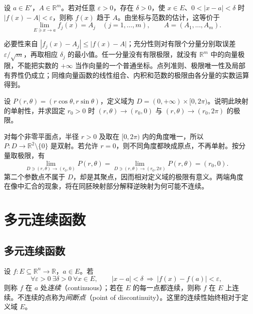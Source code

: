 \begin{definition}
\label{def:vector-valued-function-limit}
设 $a\in E'$，$A\in\mathbb R^m$。若对任意 $\varepsilon>0$，存在 $\delta>0$，使 $x\in E$、$0<|x-a|<\delta$ 时 $|f(x)-A|<\varepsilon$，则称 $f(x)$ 趋于 $A$。由坐标与范数的估计，这等价于
\[
    \lim_{E\ni x\to a}f_j(x)=A_j\quad(j=1,\ldots,m),\qquad
    A=(A_1,\ldots,A_m).
\]
\end{definition}

必要性来自 $|f_j(x)-A_j|\leq|f(x)-A|$；充分性则对有限个分量分别取误差 $\varepsilon/\sqrt m$，再取相应 $\delta_j$ 的最小值。任一分量没有有限极限，就没有 $\mathbb R^m$ 中的向量极限，不能把实数的 $+\infty$ 当作向量的一个普通坐标。点列准则、极限唯一性及局部有界性仍成立；同维向量函数的线性组合、内积和范数的极限由各分量的实数运算得到。

\begin{example}
\label{ex:polar-map-boundary-limits}
设 $P(r,\theta)=(r\cos\theta,r\sin\theta)$，定义域为 $D=(0,+\infty)\times[0,2\pi)$。说明此映射的单射性，并求固定 $r_0>0$ 时 $(r,\theta)\to(r_0,0)$ 与 $(r,\theta)\to(r_0,2\pi)$ 的极限。
\end{example}

\begin{solve}
对每个非零平面点，半径 $r>0$ 及取在 $[0,2\pi)$ 内的角度唯一，所以 $P:D\to\mathbb R^2\setminus\{0\}$ 是双射。若允许 $r=0$，则不同角度都映成原点，不再单射。按分量取极限，有
\[
    \lim_{D\ni(r,\theta)\to(r_0,0)}P(r,\theta)
       =\lim_{D\ni(r,\theta)\to(r_0,2\pi)}P(r,\theta)=(r_0,0).
\]
第二个参数点不属于 $D$，却是其聚点，因而相对定义域的极限有意义。两端角度在像中汇合的现象，将在同胚映射部分解释逆映射为何可能不连续。
\end{solve}

\section{多元连续函数}
\label{sec:continuous-multivariable-functions}

\subsection{多元连续函数}
\label{subsec:continuous-multivariable-functions}

\begin{definition}
\label{def:relative-multivariable-continuity}
设 $f:E\subseteq\mathbb R^n\to\mathbb R$，$a\in E$。若
\[
    \forall\varepsilon>0\ \exists\delta>0\ \forall x\in E,
    \qquad |x-a|<\delta\ \Longrightarrow\ |f(x)-f(a)|<\varepsilon,
\]
则称 $f$ 在 $a$ 处\emph{连续}（continuous）；若在 $E$ 的每一点都连续，则称 $f$ 在 $E$ 上连续。不连续的点称为\emph{间断点}（point of discontinuity）。这里的连续性始终相对于定义域 $E$。
\end{definition}

